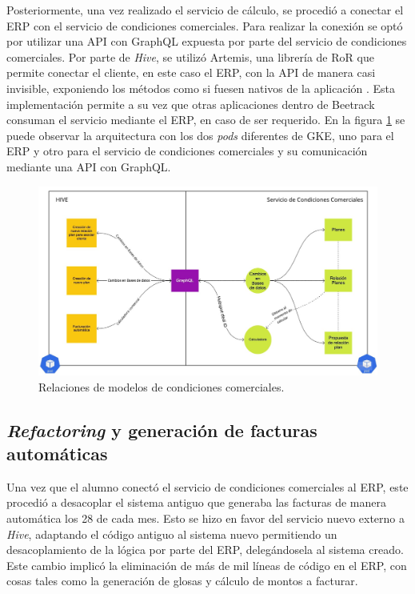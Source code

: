     Posteriormente, una vez realizado el servicio de cálculo, se procedió a conectar el ERP con el servicio de condiciones comerciales. Para realizar la conexión se optó por utilizar una API con GraphQL expuesta por parte del servicio de condiciones comerciales. Por parte de \textit{Hive}, se utilizó Artemis, una librería de RoR que permite conectar el cliente, en este caso el ERP, con la API de manera casi invisible, exponiendo los métodos como si fuesen nativos de la aplicación \cite{artemis_gem}. Esta implementación permite a su vez que otras aplicaciones dentro de Beetrack consuman el servicio mediante el ERP, en caso de ser requerido. En la figura \ref{fig:cc_arquitectura} se puede observar la arquitectura con los dos \textit{pods} diferentes de GKE, uno para el ERP y otro para el servicio de condiciones comerciales y su comunicación mediante una API con GraphQL.

    \begin{figure}
      \centering
      \includegraphics[width=\linewidth]{figures/cc/cc_arquitectura.jpg}
      \caption{Relaciones de modelos de condiciones comerciales.}
      \label{fig:cc_arquitectura}
    \end{figure}
    
  \subsection{\textit{Refactoring} y generación de facturas automáticas}

    Una vez que el alumno conectó el servicio de condiciones comerciales al ERP, este procedió a desacoplar el sistema antiguo que generaba las facturas de manera automática los 28 de cada mes. Esto se hizo en favor del servicio nuevo externo a \textit{Hive}, adaptando el código antiguo al sistema nuevo permitiendo un desacoplamiento de la lógica por parte del ERP, delegándosela al sistema creado. Este cambio implicó la eliminación de más de mil líneas de código en el ERP, con cosas tales como la generación de glosas y cálculo de montos a facturar.

